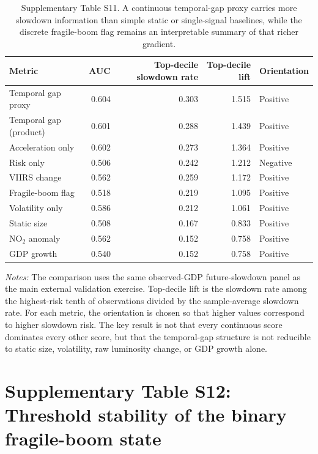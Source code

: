 \documentclass[oneside,pdflatex,sn-nature]{sn-jnl}
\begin{document}
\begin{table}[H]
\centering
\caption{Supplementary Table S11. A continuous temporal-gap proxy carries more slowdown information than simple static or single-signal baselines, while the discrete fragile-boom flag remains an interpretable summary of that richer gradient.}
\small
\setlength{\tabcolsep}{4pt}
\begin{tabular}{p{}rrrp{}}
\toprule
Metric & AUC & Top-decile slowdown rate & Top-decile lift & Orientation \\
\midrule
Temporal gap proxy & 0.604 & 0.303 & 1.515 & Positive \\
Temporal gap (product) & 0.601 & 0.288 & 1.439 & Positive \\
Acceleration only & 0.602 & 0.273 & 1.364 & Positive \\
Risk only & 0.506 & 0.242 & 1.212 & Negative \\
VIIRS change & 0.562 & 0.259 & 1.172 & Positive \\
Fragile-boom flag & 0.518 & 0.219 & 1.095 & Positive \\
Volatility only & 0.586 & 0.212 & 1.061 & Positive \\
Static size & 0.508 & 0.167 & 0.833 & Positive \\
NO$_2$ anomaly & 0.562 & 0.152 & 0.758 & Positive \\
GDP growth & 0.540 & 0.152 & 0.758 & Positive \\
\bottomrule
\end{tabular}
\end{table}
\FloatBarrier

\noindent\textit{Notes:} The comparison uses the same observed-GDP future-slowdown panel as the main external validation exercise. Top-decile lift is the slowdown rate among the highest-risk tenth of observations divided by the sample-average slowdown rate. For each metric, the orientation is chosen so that higher values correspond to higher slowdown risk. The key result is not that every continuous score dominates every other score, but that the temporal-gap structure is not reducible to static size, volatility, raw luminosity change, or GDP growth alone.

\section{Supplementary Table S12: Threshold stability of the binary fragile-boom state}
\end{document}
